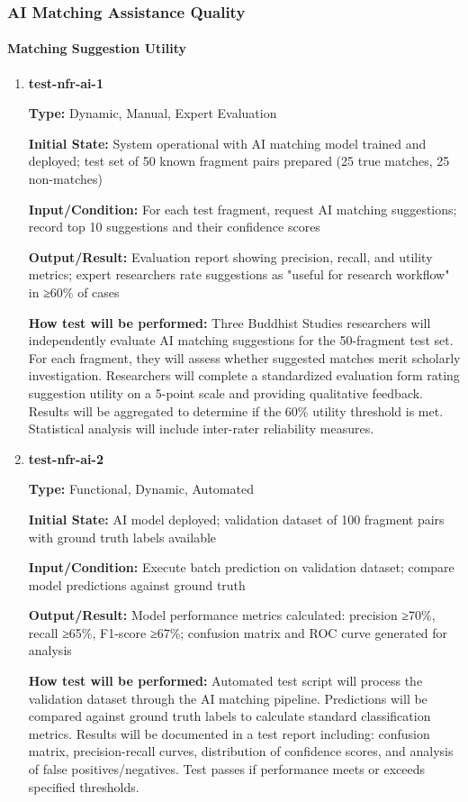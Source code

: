 \documentclass[12pt, titlepage]{article}
\begin{document}
\subsubsection{AI Matching Assistance Quality}

\paragraph{Matching Suggestion Utility}

\begin{enumerate}

\item \textbf{test-nfr-ai-1}

\textbf{Type:} Dynamic, Manual, Expert Evaluation
					
\textbf{Initial State:} System operational with AI matching model trained and deployed; test set of 50 known fragment pairs prepared (25 true matches, 25 non-matches)
					
\textbf{Input/Condition:} For each test fragment, request AI matching suggestions; record top 10 suggestions and their confidence scores
					
\textbf{Output/Result:} Evaluation report showing precision, recall, and utility metrics; expert researchers rate suggestions as "useful for research workflow" in ≥60\% of cases
					
\textbf{How test will be performed:} Three Buddhist Studies researchers will independently evaluate AI matching suggestions for the 50-fragment test set. For each fragment, they will assess whether suggested matches merit scholarly investigation. Researchers will complete a standardized evaluation form rating suggestion utility on a 5-point scale and providing qualitative feedback. Results will be aggregated to determine if the 60\% utility threshold is met. Statistical analysis will include inter-rater reliability measures.

\item \textbf{test-nfr-ai-2}

\textbf{Type:} Functional, Dynamic, Automated
					
\textbf{Initial State:} AI model deployed; validation dataset of 100 fragment pairs with ground truth labels available
					
\textbf{Input/Condition:} Execute batch prediction on validation dataset; compare model predictions against ground truth
					
\textbf{Output/Result:} Model performance metrics calculated: precision ≥70\%, recall ≥65\%, F1-score ≥67\%; confusion matrix and ROC curve generated for analysis
					
\textbf{How test will be performed:} Automated test script will process the validation dataset through the AI matching pipeline. Predictions will be compared against ground truth labels to calculate standard classification metrics. Results will be documented in a test report including: confusion matrix, precision-recall curves, distribution of confidence scores, and analysis of false positives/negatives. Test passes if performance meets or exceeds specified thresholds.

\end{enumerate}
\end{document}
